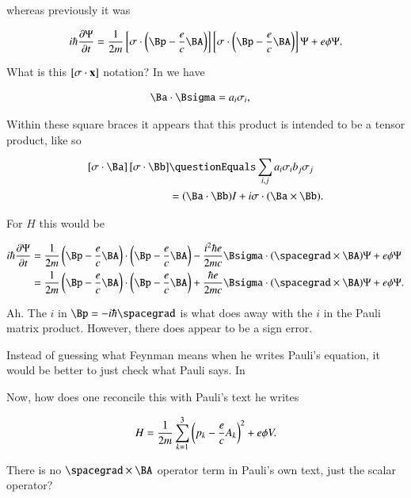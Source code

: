 whereas previously it was

\begin{align*}
i \hbar \PD{t}{\Psi} = \inv{2m} 
\left[\sigma \cdot \left( \Bp - \frac{e}{c} \BA \right)\right]
\left[\sigma \cdot \left( \Bp - \frac{e}{c} \BA \right)\right]
 \Psi + e \phi \Psi.
\end{align*}

What is this $[\sigma \cdot \mathbf{x}]$ notation?  In \cite{wiki:pauli} we have

\begin{align*}
\Ba \cdot \Bsigma &= a_i \sigma_i,
\end{align*}

Within these square braces it appears that this product is intended to be a tensor product, like so

\begin{align*}
\left[\sigma \cdot \Ba\right]
\left[\sigma \cdot \Bb\right] 
&\questionEquals \sum_{i,j} a_i \sigma_i b_j \sigma_j \\
&= (\Ba \cdot \Bb) I + i \sigma \cdot (\Ba \cross \Bb).
\end{align*}

For $H$ this would be

\begin{align*}
i \hbar \PD{t}{\Psi} 
&= \inv{2m} 
\left( \Bp - \frac{e}{c} \BA \right) \cdot \left( \Bp - \frac{e}{c} \BA \right)
- \frac{i^2 \hbar e}{2m c} \Bsigma \cdot (\spacegrad \cross \BA) \Psi + e \phi \Psi \\
&= \inv{2m} 
\left( \Bp - \frac{e}{c} \BA \right) \cdot \left( \Bp - \frac{e}{c} \BA \right)
+ \frac{\hbar e}{2m c} \Bsigma \cdot (\spacegrad \cross \BA) \Psi + e \phi \Psi.
\end{align*}

Ah.  The $i$ in $\Bp = -i \hbar \spacegrad$ is what does away with the $i$ in the Pauli matrix product.  However, there does appear to be a sign error.

Instead of guessing what Feynman means when he writes Pauli's equation, it would be better to just check what Pauli says.  In 

Now, how does one reconcile this with Pauli's text \cite{pauli2000wm} he writes

\begin{align*}
H = \frac{1}{2m} \sum_{k=1}^3 \left( p_k - \frac{e}{c}A_k \right)^2 + e \phi V.
\end{align*}

There is no $\spacegrad \cross \BA$ operator term in Pauli's own text, just the scalar operator?

